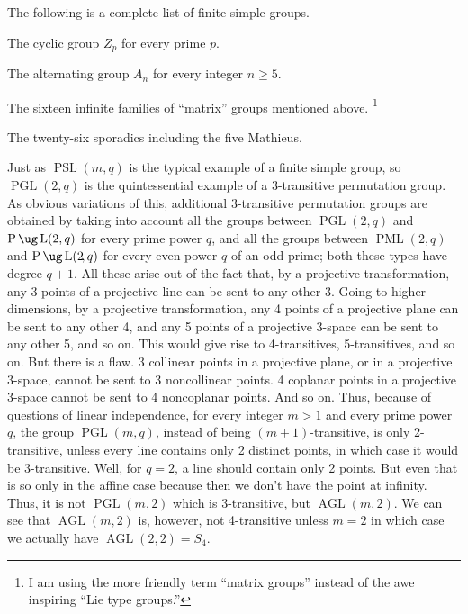  The following is a complete list of
finite simple groups.
\roster
\item The cyclic group $Z_p$ for every prime $p$.
\item The alternating group $A_n$ for every integer $n 
\geq 5$.
\item The sixteen infinite families of ``matrix'' groups 
mentioned above.
\footnote{I am using the more friendly term ``matrix 
groups'' instead of
the awe inspiring ``Lie type groups.''}
\item The twenty-six sporadics including the five Mathieus.
\endroster
\endproclaim

Just as $\operatorname{PSL}(m,q)$ is the typical example 
of a finite simple
group, so$\operatorname{PGL}(2,q)$ is the quintessential 
example of 
a $3$-transitive permutation group. As obvious variations 
of this, additional
3-transitive permutation groups are obtained by taking 
into account 
all the groups between $\operatorname{PGL}(2,q)$ and 
$\operatorname{P}
\ug \operatorname{L}(2,q)$ for 
every prime power $q$\!, and all the groups between 
$\operatorname{PML}(2\!,q)$ and
$\operatorname{P}\ug \operatorname{L}(2\!,q)$ for every 
even power $q$ of an odd prime; both these types 
have degree $q+1$. All these arise out
of the fact that, by a projective transformation, any 3 
points of a 
projective line can be sent to any other 3. Going to 
higher dimensions,
by a projective transformation, any 4 points of a 
projective plane can be
sent to any other 4, and any 5 points of a projective 
3-space can be sent to
any other 5, and so on. This would give rise to 
4-transitives,
5-transitives, and so on. But there is a flaw. 3 collinear 
points in a
projective plane, or in a projective 3-space, cannot be 
sent to 3
noncollinear points. 4 coplanar points in a projective 
3-space cannot be
sent to 4 noncoplanar points. And so on. Thus, because of 
questions of
linear independence, for every integer $m>1$ and every 
prime power $q$, 
the group $\operatorname{PGL}(m,q)$, instead of being 
$(m+1)$-transitive, is only 2-transitive, unless every 
line contains
only 2 distinct points, in which case it would be 
3-transitive.
Well, for $q=2$, a line should contain only 2 points. But 
even that is so
only in the affine case because then we don't have the 
point at infinity.
Thus, it is not $\operatorname{PGL}(m,2)$ which is 
3-transitive, but $\operatorname{AGL}(m,2)$.
We can see that $\operatorname{AGL}(m,2)$ is, however, not 
4-transitive unless $m=2$
in which case we actually have 
$\operatorname{AGL}(2,2)=S_4$.

